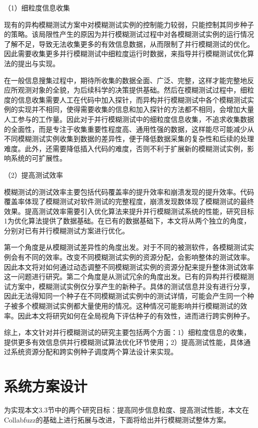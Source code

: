 \documentclass[master]{thesis-uestc}
\begin{document}
（1）细粒度信息收集

现有的异构模糊测试方案中对模糊测试实例的控制能力较弱，只能控制其同步种子的策略。该局限性产生的原因为并行模糊测试过程中对各模糊测试实例的运行情况了解不足，导致无法收集更多的有效信息数据，从而限制了并行模糊测试的优化。因此需要收集更多并行模糊测试中细粒度运行时数据，来指导并行模糊测试优化算法的提出与实现。

在一般信息搜集过程中，期待所收集的数据全面、广泛、完整，这样才能完整地反应所观测对象的全貌，为后续科学的决策提供基础。然后在模糊测试过程中，细粒度的信息收集需要人工在代码中加入探针，而异构并行模糊测试中各个模糊测试实例的实现并不相同，使得需要收集的信息和加入探针的方法都不相同，会增加大量人工参与的工作量。因此对于并行模糊测试中的细粒度信息收集，不追求收集数据的全面性，而是专注于收集重要性程度高、通用性强的数据，这样能尽可能减少从不同模糊测试实例收集到数据的差异性，便于降低数据采集的复杂性和后续的处理难度。此外，还需要降低插入代码的难度，否则不利于扩展新的模糊测试实例，影响系统的可扩展性。

（2）提高测试效率

模糊测试的测试效率主要包括代码覆盖率的提升效率和崩溃发现的提升效率。代码覆盖率体现了模糊测试对软件测试的完整程度，崩溃发现数体现了模糊测试的最终效果。提高测试效率需要引入优化算法来提升并行模糊测试系统的性能，研究目标1为优化算法提供了数据基础。在已有的数据基础下，本文将从两个独立的角度，分别对已有并行模糊测试方案进行优化。

第一个角度是从模糊测试差异性的角度出发。对于不同的被测软件，各模糊测试实例会有不同的效率。改变不同模糊测试实例的资源分配，会影响整体的测试效率。因此本文将对如何通过动态调整不同模糊测试实例的资源分配来提升整体测试效率这一问题进行研究。第二个角度是从测试冗余的角度出发。已有的异构并行模糊测试方案中，模糊测试实例仅分享产生的新种子。具体的测试信息并没有进行分享，因此无法得知同一个种子在不同模糊测试实例中的测试详情，可能会产生同一个种子被多个模糊测试实例都大量使用的情况。这种情况可能影响并行模糊测试的效率。因此本文将研究如何在全局视角下评估种子的有效性，进而进行跨实例种子。

综上，本文针对并行模糊测试的研究主要包括两个方面：1）细粒度信息的收集，提供更多有效信息供并行模糊测试算法优化环节使用；2）提高测试性能，具体通过系统资源分配和跨实例种子调度两个算法设计来实现。

\section{系统方案设计}
为实现本文3.3节中的两个研究目标：提高同步信息粒度、提高测试性能，本文在Collabfuzz的基础上进行拓展与改进，下面将给出并行模糊测试整体方案。
\end{document}
